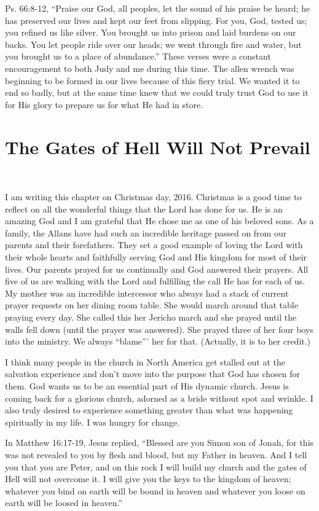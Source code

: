 \documentclass[oneside]{book}
\begin{document}
Ps. 66:8-12, “Praise our God, all peoples, let the sound of his praise be heard; he has preserved our lives and kept our feet from slipping. For you, God, tested us; you refined us like silver. You brought us into prison and laid burdens on our backs. You let people ride over our heads; we went through fire and water, but you brought us to a place of abundance.” These verses were a constant encouragement to both Judy and me during this time. The allen wrench was beginning to be formed in our lives because of this fiery trial. We wanted it to end so badly, but at the same time knew that we could truly trust God to use it for His glory to prepare us for what He had in store.


\chapter{The Gates of Hell Will Not Prevail}
\

I am writing this chapter on Christmas day, 2016. Christmas is a good time to reflect on all the wonderful things that the Lord has done for us. He is an amazing God and I am grateful that He chose me as one of his beloved sons. As a family, the Allans have had such an incredible heritage passed on from our parents and their forefathers. They set a good example of loving the Lord with their whole hearts and faithfully serving God and His kingdom for most of their lives. Our parents prayed for us continually and God answered their prayers. All five of us are walking with the Lord and fulfilling the call He has for each of us. My mother was an incredible intercessor who always had a stack of current prayer requests on her dining room table. She would march around that table praying every day. She called this her Jericho march and she prayed until the walls fell down (until the prayer was answered). She prayed three of her four boys into the ministry. We always “blame”’ her for that. (Actually, it is to her credit.)

I think many people in the church in North America get stalled out at the salvation experience and don't move into the purpose that God has chosen for them. God wants us to be an essential part of His dynamic church. Jesus is coming back for a glorious church, adorned as a bride without spot and wrinkle. I also truly desired to experience something greater than what was happening spiritually in my life. I was hungry for change.

In Matthew 16:17-19, Jesus replied, “Blessed are you Simon son of Jonah, for this was not revealed to you by flesh and blood, but my Father in heaven. And I tell you that you are Peter, and on this rock I will build my church and the gates of Hell will not overcome it. I will give you the keys to the kingdom of heaven; whatever you bind on earth will be bound in heaven and whatever you loose on earth will be loosed in heaven.”
\end{document}
